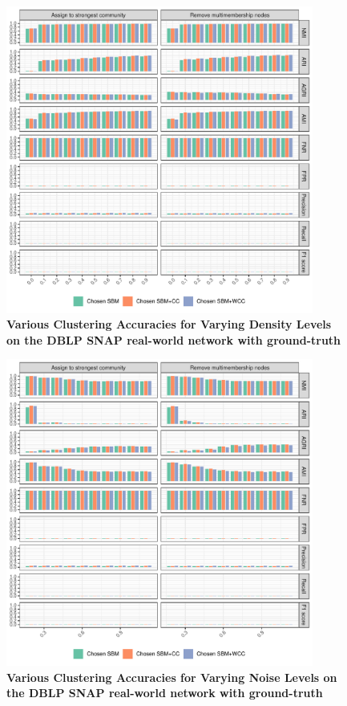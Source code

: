 \documentclass[aps,pre,superscriptaddress]{article}
\begin{document}
\begin{figure}[!htpb]
	\centering
	\includegraphics[width=0.9\textwidth]{figures/density_dblp_accuracy.pdf}
	\caption[]{\textbf{Various Clustering Accuracies for Varying Density Levels on the DBLP SNAP real-world network with ground-truth}}
	\label{fig:density-dblp-accuracy}
\end{figure}

\begin{figure}[!htpb]
	\centering
	\includegraphics[width=0.9\textwidth]{figures/noise_dblp_accuracy.pdf}
	\caption[]{\textbf{Various Clustering Accuracies for Varying Noise Levels on the DBLP SNAP real-world network with ground-truth}}
	\label{fig:noise-dblp-accuracy}
\end{figure}
\end{document}
